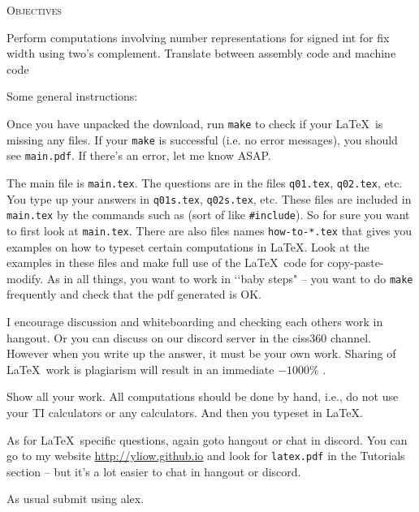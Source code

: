 \textsc{Objectives}
\begin{enumerate}
\li Perform computations involving number representations for signed int
for fix width using two's complement.
\li Translate between assembly code and machine code
\end{enumerate}

Some general instructions:
\begin{enumerate}

  \li
  Once you have unpacked the download, run \verb!make! to check if your
  \LaTeX\ is missing any files. If your \verb!make! is successful (i.e. no
  error messages), you should see \verb!main.pdf!.
  If there's an error, let me know ASAP.
  
  \li
  The main file is \verb!main.tex!.
  The questions are in the files
  \verb!q01.tex!,
  \verb!q02.tex!, etc.
  You type up your answers in
  \verb!q01s.tex!,
  \verb!q02s.tex!, etc.
  These files are included in \verb!main.tex! by the commands
  such as
  \verb!! (sort of like \verb!#include!).
  So for sure you want to first look at \verb!main.tex!.
  There are also files names \verb!how-to-*.tex! that gives you examples
  on how to typeset certain computations in \LaTeX.
  Look at the examples in these files and make full use of the \LaTeX\ code
  for copy-paste-modify.
  As in all things, you want to work in \lq\lq baby steps" --
  you want to do \verb!make! frequently and check that the pdf generated is OK.


  \li
  I encourage discussion and whiteboarding and checking each others work
  in hangout.
  Or you can discuss on our discord server
  in the ciss360 channel.
  However when you write up the answer,
  it must be your own work.
  Sharing of \LaTeX\ work is plagiarism will result in an immediate $-1000\%$    .

  \li
  Show all your work. All computations should be done by hand, i.e.,
  do not use your TI calculators or any calculators.
  And then you typeset in \LaTeX.

  \li
  As for \LaTeX\ specific questions, again goto hangout or chat in discord.
  You can go to my website \url{http://yliow.github.io}
  and look for \verb!latex.pdf! in the Tutorials section --
  but it's a lot easier to chat in hangout or discord.
  
  \li
  As usual submit using alex.
  
\end{enumerate}
